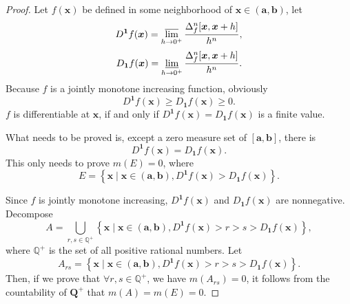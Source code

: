 \documentclass{ijclclp}
\begin{document}
\begin{proof}
    Let \(f(\boldsymbol{x})\) be defined in some neighborhood of \(\boldsymbol{x}\in(\boldsymbol{a},\boldsymbol{b})\), let
    \[D^{\boldsymbol{1}}f(\boldsymbol{x})=\varlimsup_{h\to0^{+}}\frac{\Delta_f^n[\boldsymbol{x},\boldsymbol{x}+h]}{h^n},\]
    \[D_{\boldsymbol{1}}f(\boldsymbol{x})=\varliminf_{h\to0^{+}}\frac{\Delta_f^n[\boldsymbol{x},\boldsymbol{x}+h]}{h^n}.\]
    Because \(f\) is a jointly monotone increasing function, obviously
    \[D^{\boldsymbol{1}}f(\boldsymbol{x})\geq D_{\boldsymbol{1}}f(\boldsymbol{x})\geq0.\]
    \(f\) is differentiable at \(\boldsymbol{x}\), if and only if \(D^{\boldsymbol{1}}f(\boldsymbol{x})=D_{\boldsymbol{1}}f(\boldsymbol{x})\) is a finite value. 

    What needs to be proved is, except a zero measure set of \([\boldsymbol{a},\boldsymbol{b}]\), there is
    \begin{equation}
        D^{\boldsymbol{1}}f(\boldsymbol{x})=D_{\boldsymbol{1}}f(\boldsymbol{x}).
    \end{equation}
    This only needs to prove \(m(E)=0\), where
    \[E=\left\{\boldsymbol{x}\mid \boldsymbol{x}\in(\boldsymbol{a},\boldsymbol{b}),D^{\boldsymbol{1}}f(\boldsymbol{x})>D_{\boldsymbol{1}}f(\boldsymbol{x})\right\}.\]

    Since \(f\) is jointly monotone increasing, \(D^{\boldsymbol{1}}f(\boldsymbol{x})\) and \(D_{\boldsymbol{1}}f(\boldsymbol{x})\) are nonnegative. Decompose
    \[A=\bigcup_{r,s\in\mathbb{Q}^{+}}\left\{\boldsymbol{x}\mid \boldsymbol{x}\in(\boldsymbol{a},\boldsymbol{b}),D^{\boldsymbol{1}}f(\boldsymbol{x})>r>s>D_{\boldsymbol{1}}f(\boldsymbol{x})\right\},\]
    where \(\mathbb{Q}^+\) is the set of all positive rational numbers.
    Let
    \[A_{rs}=\left\{\boldsymbol{x}\mid \boldsymbol{x}\in(\boldsymbol{a},\boldsymbol{b}),D^{\boldsymbol{1}}f(\boldsymbol{x})>r>s>D_{\boldsymbol{1}}f(\boldsymbol{x})\right\}.\]
    Then, if we prove that \(\forall r,s\in\mathbb{Q}^{+}\), we have \(m(A_{rs})=0\), it follows from the countability of \(\boldsymbol{Q}^{+}\) that \(m(A)=m(E)=0\).
    

\end{proof}
\end{document}

